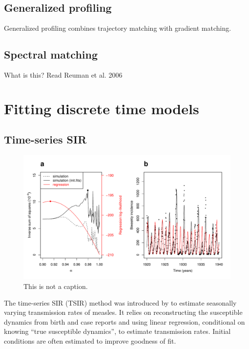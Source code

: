 \documentclass{article}
\begin{document}
\subsection{Generalized profiling}

Generalized profiling combines trajectory matching with gradient matching.

\subsection{Spectral matching}

What is this? Read Reuman et al. 2006

\section{Fitting discrete time models}

\subsection{Time-series SIR}

\begin{figure}[t]
\includegraphics[width=\textwidth]{../figure/tsir_factorial_fig.pdf}
\caption{This is not a caption.}
\end{figure}

The time-series SIR (TSIR) method was introduced by \cite{bjornstad2002dynamics} to estimate seasonally varying transmission rates of measles.
It relies on reconstructing the susceptible dynamics from birth and case reports and using linear regression, conditional on knowing ``true susceptible dynamics'', to estimate transmission rates.
Initial conditions are often estimated to improve goodness of fit.
\end{document}
